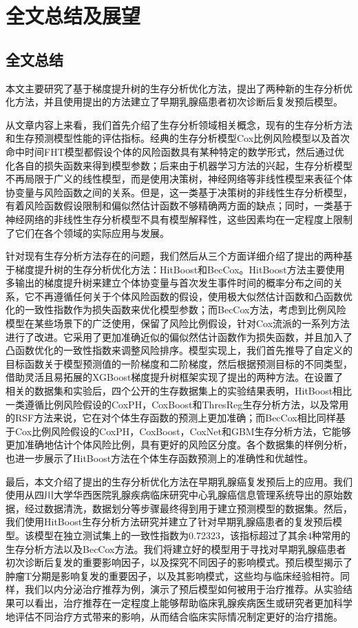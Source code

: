 \chapter{全文总结及展望}

\section{全文总结}
本文主要研究了基于梯度提升树的生存分析优化方法，提出了两种新的生存分析优化方法，并且使用提出的方法建立了早期乳腺癌患者初次诊断后复发预后模型。

从文章内容上来看，我们首先介绍了生存分析领域相关概念，现有的生存分析方法和生存预测模型性能的评估指标。经典的生存分析模型Cox比例风险模型以及首次命中时间FHT模型都假设个体的风险函数具有某种特定的数学形式，然后通过优化各自的损失函数来得到模型参数；后来由于机器学习方法的兴起，生存分析模型不再局限于广义的线性模型，而是使用决策树，神经网络等非线性模型来表征个体协变量与风险函数之间的关系。但是，这一类基于决策树的非线性生存分析模型，有着风险函数假设限制和偏似然估计函数不够精确两方面的缺点；同时，一类基于神经网络的非线性生存分析模型不具有模型解释性，这些因素均在一定程度上限制了它们在各个领域的实际应用与发展。

针对现有生存分析方法存在的问题，我们然后从三个方面详细介绍了提出的两种基于梯度提升树的生存分析优化方法：HitBoost和BecCox。HitBoost方法主要使用多输出的梯度提升树来建立个体协变量与首次发生事件时间的概率分布之间的关系，它不再遵循任何关于个体风险函数的假设，使用极大似然估计函数和凸函数优化的一致性指数作为损失函数来优化模型参数；而BecCox方法，考虑到比例风险模型在某些场景下的广泛使用，保留了风险比例假设，针对Cox流派的一系列方法进行了改进。它采用了更加准确近似的偏似然估计函数作为损失函数，并且加入了凸函数优化的一致性指数来调整风险排序。模型实现上，我们首先推导了自定义的目标函数关于模型预测值的一阶梯度和二阶梯度，然后根据预测目标的不同类型，借助灵活且易拓展的XGBoost梯度提升树框架实现了提出的两种方法。在设置了相关的数据集和实验后，四个公开的生存数据集上的实验结果表明，HitBoost相比一类遵循比例风险假设的CoxPH，CoxBoost和ThresReg生存分析方法，以及常用的RSF方法来说，它在对个体生存函数的预测上更加准确；而BecCox相比同样基于Cox比例风险假设的CoxPH，CoxBoost，CoxNet和GBM生存分析方法，它能够更加准确地估计个体风险比例，具有更好的风险区分度。各个数据集的样例分析，也进一步展示了HitBoost方法在个体生存函数预测上的准确性和优越性。

最后，本文介绍了提出的生存分析优化方法在早期乳腺癌复发预后上的应用。我们使用从四川大学华西医院乳腺疾病临床研究中心乳腺癌信息管理系统导出的原始数据，经过数据清洗，数据划分等步骤最终得到用于建立预测模型的数据集。然后，我们使用HitBoost生存分析方法研究并建立了针对早期乳腺癌患者的复发预后模型。该模型在独立测试集上的一致性指数为0.72323，该指标超过了其余4种常用的生存分析方法以及BecCox方法。我们将建立好的模型用于寻找对早期乳腺癌患者初次诊断后复发的重要影响因子，以及探究不同因子的影响模式。预后模型揭示了肿瘤T分期是影响复发的重要因子，以及其影响模式，这些均与临床经验相符。同样，我们以内分泌治疗推荐为例，演示了预后模型如何被用于治疗推荐。从实验结果可以看出，治疗推荐在一定程度上能够帮助临床乳腺疾病医生或研究者更加科学地评估不同治疗方式带来的影响，从而结合临床实际情况制定更好的治疗措施。

